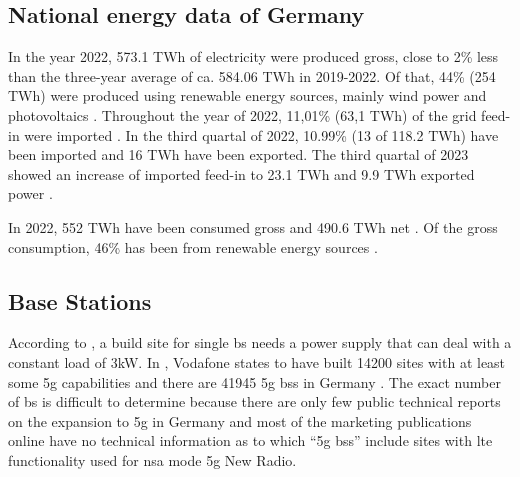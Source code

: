 \documentclass[11pt,a4paper]{article}
\begin{document}
\subsection{National energy data of Germany}\label{subsec:nationalaverage}
In the year 2022, 573.1 TWh of electricity were produced gross, close to 2\% less than the three-year average of ca. 584.06 TWh in 2019-2022.
Of that, 44\% (254 TWh) were produced using renewable energy sources, mainly wind power and photovoltaics \citep{Bruttostromerzeugung}.
Throughout the year of 2022, 11,01\% (63,1 TWh) of the grid feed-in were imported \citep{energieErzeugung}.
In the third quartal of 2022, 10.99\% (13 of 118.2 TWh) have been imported and 16 TWh have been exported.
The third quartal of 2023 showed an increase of imported feed-in to 23.1 TWh and 9.9 TWh exported power \citep{stromerzeugung3Quartal2023}.

In 2022, 552 TWh have been consumed gross \citep{Stromverbrauch} and 490.6 TWh net \citep{NettoStromverbrauch}.
Of the gross consumption, 46\% has been from renewable energy sources \citep{Stromverbrauch}.

\subsection{Base Stations}\label{subsec:BSInfluence}

According to \cite{BSStandort}, a build site for single \acrshort{bs} needs a power supply that can deal with a constant load of 3kW.
In \cite{vodafoneAusbau}, Vodafone states to have built 14200 sites with at least some \acrshort{5g} capabilities and there are 41945 \acrshort{5g} \acrlong{bs}s in Germany \citep{5gBS}.
The exact number of \acrshort*{bs} is difficult to determine because there are only few public technical reports on the expansion to \acrshort{5g} in Germany and most of the marketing publications online have no technical information as to which \enquote{\acrshort{5g} \acrlong{bs}s} include sites with \acrfull{lte} functionality used for \acrfull{nsa} mode \acrshort{5g} New Radio.
\end{document}
